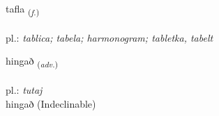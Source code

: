 \documentclass[frontgrid, backgrid]{flacards}\usepackage[]{graphicx}\usepackage[]{xcolor}
\begin{document}
\renewcommand{\flhead}{\vskip5pt \fboxsep=0pt {\small\bfseries\footnotesize Nafnorð | Noun}}
\renewcommand{\fcfoot}{\vskip5pt \fboxsep=0pt \hspace{2pt}{\small\bfseries\footnotesize 1K}}

\renewcommand{\blhead}{\vskip5pt {\small\bfseries\footnotesize Nafnorð | Noun }}
\renewcommand{\bcfoot}{\vskip5pt \hspace{2pt}{\small\bfseries\footnotesize 1K}}


{tafla \small{\textsubscript{(\textit{f.})}} \\[1ex] %
\textphonetic{[tʰapla]} \\
pl.: \emph{tablica; tabela; harmonogram; tabletka, tabelt} \\  [2ex]
\renewcommand*{\arraystretch}{0.8}
}


\renewcommand{\flhead}{\vskip5pt \fboxsep=0pt {\small\bfseries\footnotesize Atviksorð | Adverb}}
\renewcommand{\fcfoot}{\vskip5pt \fboxsep=0pt \hspace{2pt}{\small\bfseries\footnotesize 1K}}

\renewcommand{\blhead}{\vskip5pt {\small\bfseries\footnotesize Atviksorð | Adverb }}
\renewcommand{\bcfoot}{\vskip5pt \hspace{2pt}{\small\bfseries\footnotesize 1K}}


{hingað \small{\textsubscript{(\textit{adv.})}} \\[1ex]
\textphonetic{[hiŋkað]} \\
pl.: \emph{tutaj} \\  [2ex]
hingað (Indeclinable)}

\renewcommand{\flhead}{\vskip5pt \fboxsep=0pt {\small\bfseries\footnotesize Nafnorð | Noun}}
\renewcommand{\fcfoot}{\vskip5pt \fboxsep=0pt \hspace{2pt}{\small\bfseries\footnotesize 1K}}
\end{document}
